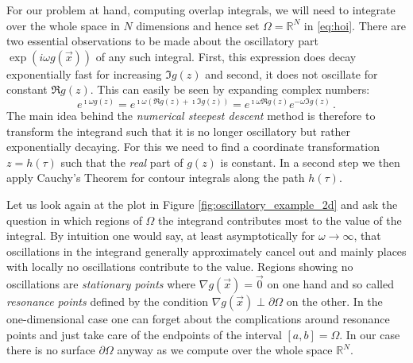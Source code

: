 \documentclass[a4paper,10pt]{article}
\begin{document}
For our problem at hand, computing overlap integrals, we will need to integrate
over the whole space in $N$ dimensions and hence set $\Omega = \mathbb{R}^N$ in
\eqref{eq:hoi}.
There are two essential observations to be made about the
oscillatory part $\exp\left(i\omega g\left(\vec{x}\right) \right)$
of any such integral. First, this expression does decay exponentially
fast for increasing $\Im g(z)$ and second, it does not oscillate for
constant $\Re g(z)$. This can easily be seen by expanding complex numbers:
\begin{equation*}
  e^{\imath \omega g(z)}
  =
  e^{\imath \omega (\Re g(z) + \imath \Im g(z))}
  =
  e^{\imath \omega \Re g(z)}
  e^{- \omega \Im g(z)} \,.
\end{equation*}
The main idea behind the \emph{numerical steepest descent} method is therefore
to transform the integrand such that it is no longer oscillatory but
rather exponentially decaying. For this we need to find a coordinate
transformation $z = h(\tau)$ such that the \emph{real} part of $g(z)$
is constant. In a second step we then apply Cauchy's Theorem for contour
integrals along the path $h(\tau)$.

Let us look again at the plot in Figure \ref{fig:oscillatory_example_2d}
and ask the question in which regions of $\Omega$ the integrand contributes most
to the value of the integral. By intuition one would say, at least asymptotically
for $\omega \rightarrow \infty$, that oscillations in the integrand generally approximately
cancel out and mainly places with locally no oscillations contribute to the value.
Regions showing no oscillations are \emph{stationary points} where
$\nabla g(\vec{x}) = \vec{0}$ on one hand and so called \emph{resonance points}
defined by the condition $\nabla g(\vec{x}) \perp \partial \Omega$ on the other.
In the one-dimensional case one can forget about the complications around resonance
points and just take care of the endpoints of the interval $[a, b] = \Omega$. In our
case there is no surface $\partial \Omega$ anyway as we compute over the whole space
$\mathbb{R}^N$.
\end{document}
